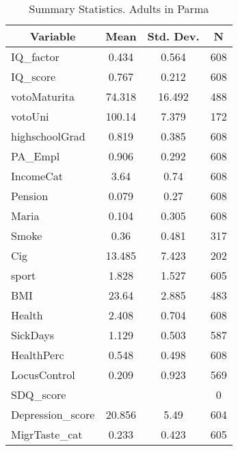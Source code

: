 
\begin{table}[htbp]\centering \caption{Summary Statistics. Adults in Parma \label{cityAdultParma}}
\begin{tabular}{l c c  c}\hline\hline
\multicolumn{1}{c}{\textbf{Variable}} & \textbf{Mean}
 & \textbf{Std. Dev.} & \textbf{N}\\ \hline
IQ\_factor & 0.434 & 0.564  & 608\\
IQ\_score & 0.767 & 0.212  & 608\\
votoMaturita & 74.318 & 16.492  & 488\\
votoUni & 100.14 & 7.379  & 172\\
highschoolGrad & 0.819 & 0.385  & 608\\
PA\_Empl & 0.906 & 0.292  & 608\\
IncomeCat & 3.64 & 0.74  & 608\\
Pension & 0.079 & 0.27  & 608\\
Maria & 0.104 & 0.305  & 608\\
Smoke & 0.36 & 0.481  & 317\\
Cig & 13.485 & 7.423  & 202\\
sport & 1.828 & 1.527  & 605\\
BMI & 23.64 & 2.885  & 483\\
Health & 2.408 & 0.704  & 608\\
SickDays & 1.129 & 0.503  & 587\\
HealthPerc & 0.548 & 0.498  & 608\\
LocusControl & 0.209 & 0.923  & 569\\
SDQ\_score &  &   & 0\\
Depression\_score & 20.856 & 5.49  & 604\\
MigrTaste\_cat & 0.233 & 0.423  & 605\\
\hline\end{tabular}
\end{table}
